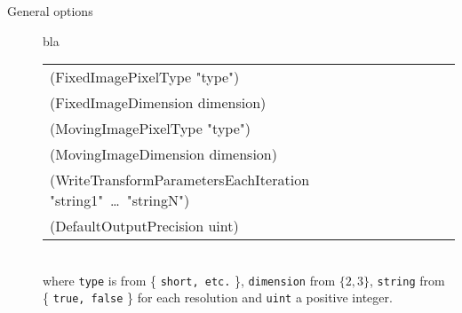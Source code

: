 \documentclass[a4paper]{article}
\newenvironment{Tabular}[1]{\ttfamily \begin{tabular}{#1}}{\end{tabular}}
\begin{document}
\begin{description}
\item[General options] bla\\
    \begin{Tabular}{l}
    (FixedImagePixelType "type") \\
    (FixedImageDimension dimension) \\
    (MovingImagePixelType "type") \\
    (MovingImageDimension dimension) \\
    (WriteTransformParametersEachIteration "string1"~\ldots~"stringN") \\
    (DefaultOutputPrecision uint)
    \end{Tabular}\\
where \texttt{type} is from \{ \texttt{short, etc.} \}, \texttt{dimension} from $\{2,3\}$,
\texttt{string} from \{ \texttt{true, false} \} for each resolution and \texttt{uint} a positive
integer.


\end{description}
\end{document}
